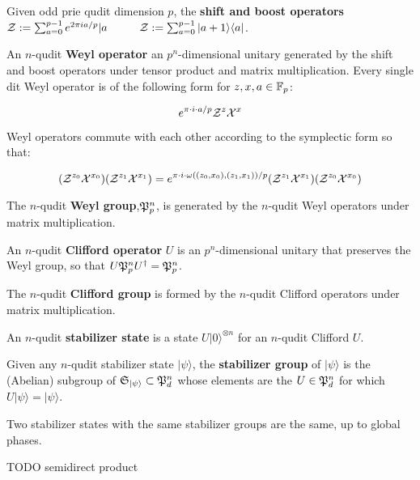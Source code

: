 \begin{definition}
\label{definition:begin}
Given odd prie qudit dimension $p$, the  {\bf shift and boost operators} 
${\cal Z} := \sum_{a =0}^{p-1} e^{2\pi i a/p} |  a  \hspace*{1cm }{\cal Z} := \sum_{a =0}^{p-1}  |  a+1 \rangle\langle a |$.



An $n$-qudit {\bf Weyl operator} an $p^n$-dimensional unitary generated by the shift and boost operators under tensor product and matrix multiplication. Every single dit Weyl operator is of the following form for $z,x,a \in \mathbb{F}_p$:

$$
e^{\pi \cdot i\cdot a /p} {\cal Z}^z{\cal X}^x
$$

Weyl operators commute with each other according to the symplectic form so that:

$$
({\cal Z}^{z_0}{\cal X}^{x_0}) 
({\cal Z}^{z_1}{\cal X}^{x_1} )
=
e^{\pi\cdot i \cdot \omega((z_0,x_0),(z_1,x_1)) /p}
({\cal Z}^{z_1}{\cal X}^{x_1})
({\cal Z}^{z_0}{\cal X}^{x_0}  )
$$

The $n$-qudit {\bf Weyl group},${\frak P}_p^{ n}$, is generated by the $n$-qudit Weyl operators under matrix multiplication.


An $n$-qudit {\bf Clifford operator} $U$ is an $p^n$-dimensional unitary that preserves the Weyl group, so that $U {\frak P}_p^{ n} U^\dag = {\frak P}_p^{ n}$.

The $n$-qudit {\bf Clifford group} is formed by the $n$-qudit Clifford operators under matrix multiplication.

An $n$-qudit {\bf stabilizer state} is a state $ U |0\rangle^{\otimes n}$ for an $n$-qudit Clifford $U$.

Given any $n$-qudit stabilizer state $|\psi \rangle$,  the {\bf stabilizer group} of $|\psi \rangle$  is the (Abelian) subgroup of ${\frak S}_{|\psi\rangle} \subset {\frak P}_d^{ n}$ whose elements are the $U \in {\frak P}_d^{ n}$ for which $U|\psi \rangle=|\psi \rangle$.
\end{definition}


\begin{lemma}
Two stabilizer states with the same stabilizer groups are the same, up to global phases.
\end{lemma}

TODO semidirect product

